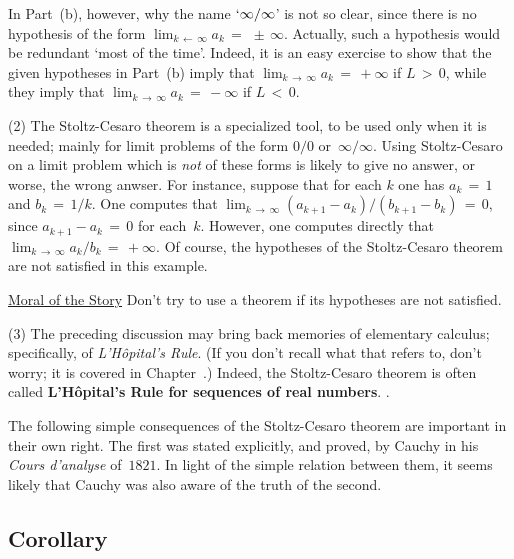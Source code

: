         In Part~(b), however, why the name $`{\infty}/{\infty}$' is not so clear,
    since there is no hypothesis of the form $\lim_{k \,{\leftarrow}\, {\infty}} a_{k} \,=\,  \,{\pm}\, {\infty}$.
    Actually, such a hypothesis would be redundant `most of the time'. Indeed, it is an easy exercise to show that
    the given hypotheses in Part~(b) imply that $\lim_{k \,{\rightarrow}\, {\infty}} a_{k} \,=\,+{\infty}$ if $L\,>\,0$,
    while they imply that $\lim_{k \,{\rightarrow}\, {\infty}} a_{k} \,=\, -{\infty}$ if $L\,<\,0$.

\V

        (2) The Stoltz-Cesaro theorem is a specialized tool, to be used only when it is needed; mainly for limit problems of the form $0/0$ or~${\infty}/{\infty}$.
    Using Stoltz-Cesaro on a limit problem which is {\em not} of these forms is likely to give no answer, or worse, the wrong anwser.
    For instance, suppose that for each $k$ one has $a_{k} \,=\, 1$ and $b_{k} \,=\, 1/k$.
    One computes that ${\displaystyle \lim_{k \,{\rightarrow}\, {\infty}}(a_{k+1}-a_{k})/(b_{k+1}-b_{k}) \,=\, 0}$, since $a_{k+1}-a_{k} \,=\, 0$ for each~$k$.
    However, one computes directly that ${\displaystyle \lim_{k \,{\rightarrow}\, {\infty}} a_{k}/b_{k} \,=\, +{\infty}}$.
    Of course, the hypotheses of the Stoltz-Cesaro theorem are not satisfied in this example.

        \underline{Moral of the Story} Don't try to use a theorem if its hypotheses are not satisfied.

\V

        (3) The preceding discussion may bring back memories of elementary calculus; specifically, of {\em L'H\^{o}pital's Rule}.
    (If you don't recall what that refers to, don't worry; it is covered in Chapter~.)
    Indeed, the Stoltz-Cesaro theorem is often called {\bf L'H\^{o}pital's Rule for sequences of real numbers}.
    .

\V

        The following simple consequences of the Stoltz-Cesaro theorem are important in their own right.
    The first was stated explicitly, and proved, by Cauchy in his {\em Cours d'analyse} of~$1821$.
    In light of the simple relation between them, it seems likely that Cauchy was also aware of the truth of the second.


\VV


            \subsection{\small{\bf Corollary}}
            \label{CorC40.85}

